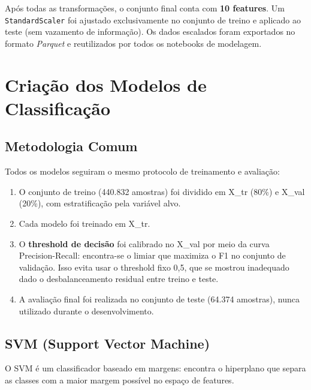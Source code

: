\documentclass[12pt, a4paper]{article}
\begin{document}
Após todas as transformações, o conjunto final conta com \textbf{10 features}.
Um \texttt{StandardScaler} foi ajustado exclusivamente no conjunto de treino e
aplicado ao teste (sem vazamento de informação). Os dados escalados foram exportados
no formato \textit{Parquet} e reutilizados por todos os notebooks de modelagem.

\section{Criação dos Modelos de Classificação}

\subsection{Metodologia Comum}

Todos os modelos seguiram o mesmo protocolo de treinamento e avaliação:

\begin{enumerate}
  \item O conjunto de treino (440.832 amostras) foi dividido em X\_tr (80\%) e
        X\_val (20\%), com estratificação pela variável alvo.

  \item Cada modelo foi treinado em X\_tr.

  \item O \textbf{threshold de decisão} foi calibrado no X\_val por meio da curva
        Precision-Recall: encontra-se o limiar que maximiza o F1 no conjunto de
        validação. Isso evita usar o threshold fixo 0,5, que se mostrou inadequado
        dado o desbalanceamento residual entre treino e teste.

  \item A avaliação final foi realizada no conjunto de teste (64.374 amostras),
        nunca utilizado durante o desenvolvimento.
\end{enumerate}

\subsection{SVM (Support Vector Machine)}

O SVM é um classificador baseado em margens: encontra o hiperplano que separa as
classes com a maior margem possível no espaço de features.
\end{document}
